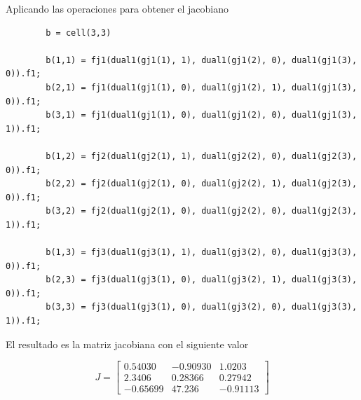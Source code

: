 \documentclass[a4paper, 12pt]{article}
\begin{document}
    Aplicando las operaciones para obtener el jacobiano

    \begin{verbatim}
        b = cell(3,3)

        b(1,1) = fj1(dual1(gj1(1), 1), dual1(gj1(2), 0), dual1(gj1(3), 0)).f1;
        b(2,1) = fj1(dual1(gj1(1), 0), dual1(gj1(2), 1), dual1(gj1(3), 0)).f1;
        b(3,1) = fj1(dual1(gj1(1), 0), dual1(gj1(2), 0), dual1(gj1(3), 1)).f1;

        b(1,2) = fj2(dual1(gj2(1), 1), dual1(gj2(2), 0), dual1(gj2(3), 0)).f1;
        b(2,2) = fj2(dual1(gj2(1), 0), dual1(gj2(2), 1), dual1(gj2(3), 0)).f1;
        b(3,2) = fj2(dual1(gj2(1), 0), dual1(gj2(2), 0), dual1(gj2(3), 1)).f1;

        b(1,3) = fj3(dual1(gj3(1), 1), dual1(gj3(2), 0), dual1(gj3(3), 0)).f1;
        b(2,3) = fj3(dual1(gj3(1), 0), dual1(gj3(2), 1), dual1(gj3(3), 0)).f1;
        b(3,3) = fj3(dual1(gj3(1), 0), dual1(gj3(2), 0), dual1(gj3(3), 1)).f1;
    \end{verbatim}

    El resultado es la matriz jacobiana con el siguiente valor

    \[
        J = \begin{bmatrix}
            0.54030 & -0.90930 & 1.0203 \\
            2.3406 & 0.28366 & 0.27942 \\
            -0.65699 & 47.236 & -0.91113
        \end{bmatrix}
    \]


    
\end{document}
